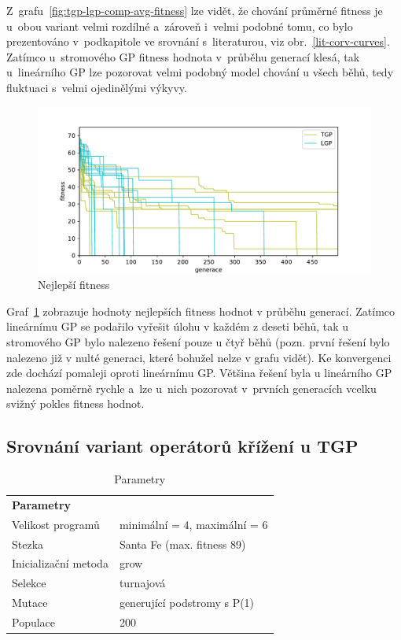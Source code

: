 Z~grafu~\ref{fig:tgp-lgp-comp-avg-fitness} lze vidět, že chování průměrné fitness je u~obou variant velmi rozdílné a~zároveň i~velmi podobné tomu, co bylo prezentováno v~podkapitole ve srovnání s~literaturou, viz obr.~\ref{lit-corv-curves}. Zatímco u~stromového GP fitness hodnota v~průběhu generací klesá, tak u~lineárního GP lze pozorovat velmi podobný model chování u všech běhů, tedy fluktuaci s~velmi ojedinělými výkyvy. 

\begin{figure}[!h]
    \centering
    \includegraphics[scale=0.7]{obrazky-figures/tgp-lgp-comp-best-fitness.pdf}
    \caption{Nejlepší fitness}
    \label{fig:tgp-lgp-comp-best-fitness}
\end{figure}  

Graf~\ref{fig:tgp-lgp-comp-best-fitness} zobrazuje hodnoty nejlepších fitness hodnot v průběhu generací. Zatímco lineárnímu GP se podařilo vyřešit úlohu v každém z deseti běhů, tak u stromového GP bylo nalezeno řešení pouze u čtyř běhů (pozn. první řešení bylo nalezeno již v nulté generaci, které bohužel nelze v grafu vidět). Ke konvergenci zde dochází pomaleji oproti lineárnímu GP. Většina řešení byla u lineárního GP nalezena poměrně rychle a~lze u~nich pozorovat v~prvních generacích vcelku svižný pokles fitness hodnot.

\subsection{Srovnání variant operátorů křížení u TGP}

\begin{table}[h!]
\centering
\begin{tabular}{ll}
\hline
\textbf{Parametry}  &                               \\
Velikost programů   & minimální = 4, maximální  = 6 \\
Stezka              & Santa Fe (max. fitness 89)                    \\
Inicializační metoda & grow                          \\
Selekce             & turnajová                     \\
Mutace              & generující podstromy s P(1)         \\ 
Populace              & 200         \\ \hline
\end{tabular}
\caption{Parametry}
\label{tab:tba}
\end{table}

